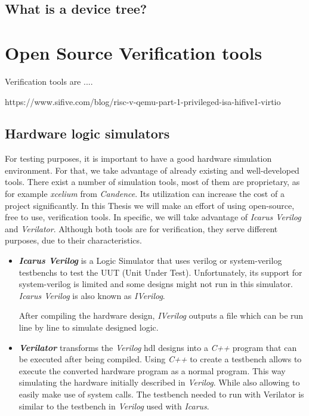 \subsection{What is a device tree?}

\section{Open Source Verification tools}
\label{section:verification_tools}
Verification tools are ....

https://www.sifive.com/blog/risc-v-qemu-part-1-privileged-isa-hifive1-virtio

\subsection{Hardware logic simulators}
For testing purposes, it is important to have a good hardware simulation environment. For that, we take advantage of already existing and well-developed tools. There exist a number of simulation tools, most of them are proprietary, as for example \textit{xcelium} from \textit{Candence}. Its utilization can increase the cost of a project significantly. In this Thesis we will make an effort of using open-source, free to use, verification tools. In specific, we will take advantage of \textit{Icarus Verilog} and \textit{Verilator}. Although both tools are for verification, they serve different purposes, due to their characteristics.

\begin{itemize}
    \item \textbf{\textit{Icarus Verilog}} is a Logic Simulator that uses verilog or system-verilog testbenchs to test the UUT (Unit Under Test). Unfortunately, its support for system-verilog is limited and some designs might not run in this simulator. \textit{Icarus Verilog} is also known as \textit{IVerilog}.
    
    After compiling the hardware design, \textit{IVerilog} outputs a file which can be run line by line to simulate designed logic.
    
    \item \textbf{\textit{Verilator}} transforms the \textit{Verilog} \acrshort{hdl} designs into a \textit{C++} program that can be executed after being compiled. Using \textit{C++} to create a testbench allows to execute the converted hardware program as a normal program. This way simulating the hardware initially described in \textit{Verilog}. While also allowing to easily make use of system calls. The testbench needed to run with Verilator is similar to the testbench in \textit{Verilog} used with \textit{Icarus}.
\end{itemize}

